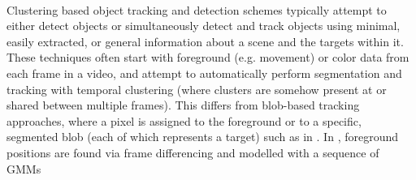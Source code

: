 \documentclass{article}
\begin{document}
\\
Clustering based object tracking and detection schemes typically attempt to either detect objects or simultaneously detect and track objects using minimal, easily extracted, or general information about a scene and the targets within it. These techniques often start with foreground (e.g. movement) or color data from each frame in a video, and attempt to automatically perform segmentation and tracking with temporal clustering (where clusters are somehow present at or shared between multiple frames). This differs from blob-based tracking approaches, where a pixel is assigned to the foreground or to a specific, segmented blob (each of which represents a target) such as in \cite{stauffer_1999}. In \cite{pece_2002}, foreground positions are found via frame differencing and modelled with a sequence of GMMs\\
\cite{beleznai_2006}
\cite{dickinson_2005}
\cite{schiele_2006}
  \\
\\
\end{document}
